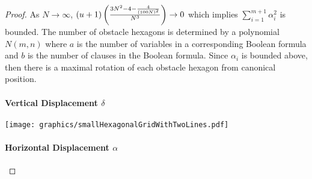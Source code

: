 \begin{proof}

As $N \rightarrow \infty$, $(u+1) \left( \frac{3N^2 - 4 - \frac{4}{(100N)^2}}{N^3} \right)\rightarrow 0$ which implies $\sum_{i = 1}^{m+1} \alpha_i^2$ is bounded.  
The number of obstacle hexagons is determined by a polynomial $N(m,n)$ where $a$ is the number of variables in a corresponding Boolean formula and $b$ is the number of clauses in the Boolean formula.
Since $\alpha_i$ is bounded above, then there is a maximal rotation of each obstacle hexagon from canonical position.


\paragraph{Vertical Displacement $\delta$}



\begin{minipage}{\linewidth}
\begin{center}
\texttt{[image: graphics/smallHexagonalGridWithTwoLines.pdf]}
\label{fig:smallHexagonalGridWithTwoLines.pdf}
\end{center}
\end{minipage}

\paragraph{Horizontal Displacement $\alpha$}
\end{proof}